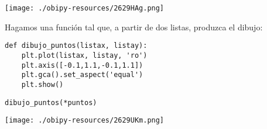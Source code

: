 \documentclass[11pt]{article}
\begin{document}
\begin{center}
\texttt{[image: ./obipy-resources/2629HAg.png]}
\end{center}

Hagamos una función tal que, a partir de dos listas, produzca el dibujo:

\lstset{language=ipython,label= ,caption= ,captionpos=b,numbers=none}
\begin{lstlisting}
def dibujo_puntos(listax, listay):
    plt.plot(listax, listay, 'ro')
    plt.axis([-0.1,1.1,-0.1,1.1])
    plt.gca().set_aspect('equal')
    plt.show()
\end{lstlisting}

\lstset{language=ipython,label= ,caption= ,captionpos=b,numbers=none}
\begin{lstlisting}
dibujo_puntos(*puntos)
\end{lstlisting}

\begin{center}
\texttt{[image: ./obipy-resources/2629UKm.png]}
\end{center}
\end{document}
